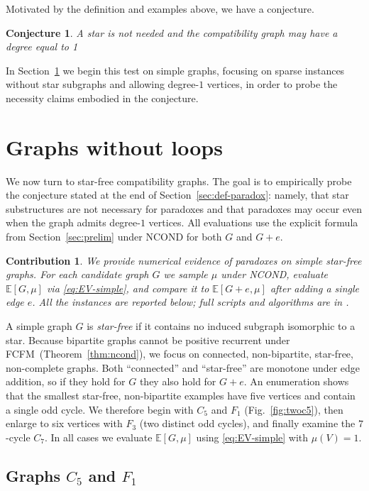 \documentclass[11pt]{article}
\newtheorem{conjecture}[theorem]{Conjecture}
\newtheorem{contribution}{Contribution}
\newcommand{\fcfm}{\textsc{FCFM}}
\begin{document}
Motivated by the definition and examples above, we have a conjecture.
\begin{conjecture}
A star is not needed and the compatibility graph may have a degree equal to 1
\end{conjecture}

In Section~\ref{sec:without-loops} we begin this test on simple graphs, focusing on sparse instances without star subgraphs and allowing degree-$1$ vertices, in order to probe the necessity claims embodied in the conjecture.

\section{Graphs without loops}\label{sec:without-loops}

We now turn to star-free compatibility graphs. The goal is to empirically probe the conjecture stated at the end of Section~\ref{sec:def-paradox}: namely, that star substructures are not necessary for paradoxes and that paradoxes may occur even when the graph admits degree-$1$ vertices. All evaluations use the explicit formula from Section~\ref{sec:prelim} under \textsc{NCOND} for both $G$ and $G+e$.


\begin{contribution}
We provide \emph{numerical} evidence of paradoxes on simple star-free graphs. 
For each candidate graph $G$ we sample $\mu$ under NCOND, evaluate $\mathbb{E}[G,\mu]$ via \eqref{eq:EV-simple}, and compare it to $\mathbb{E}[G+e,\mu]$ after adding a single edge $e$. 
All the  instances are reported below; full scripts and algorithms are in \cite{li2025b}.
\end{contribution}

A simple graph $G$ is \emph{star-free} if it contains no induced subgraph isomorphic to a star.
Because bipartite graphs cannot be positive recurrent under \fcfm\ (Theorem~\ref{thm:ncond}), we focus on connected, non-bipartite, star-free, non-complete graphs.
Both “connected” and “star-free” are monotone under edge addition, so if they hold for $G$ they also hold for $G+e$.
An enumeration shows that the smallest star-free, non-bipartite examples have five vertices and contain a single odd cycle. 
We therefore begin with $C_5$ and $F_1$ (Fig.~\ref{fig:twoc5}), then enlarge to six vertices with $F_3$ (two distinct odd cycles), and finally examine the $7$-cycle $C_7$.
In all cases we evaluate $\mathbb{E}[G,\mu]$ using \eqref{eq:EV-simple} with $\mu(V)=1$.

\subsection{Graphs $C_5$ and $F_1$}
\end{document}
